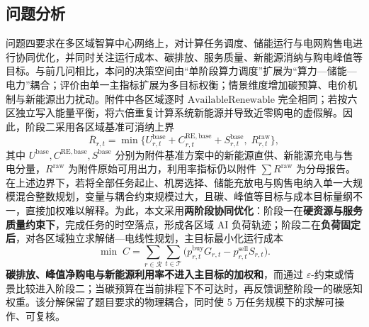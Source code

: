 \documentclass[UTF8,a4paper,zihao=-4]{ctexart}
\begin{document}
\subsection{问题分析}
问题四要求在多区域智算中心网络上，对计算任务调度、储能运行与电网购售电进行协同优化，并同时关注运行成本、碳排放、服务质量、新能源消纳与购电峰值等目标。与前几问相比，本问的决策空间由“单阶段算力调度”扩展为“算力—储能—电力”耦合；评价由单一主指标扩展为多目标权衡；情景维度增加碳预算、电价机制与新能源出力扰动。附件中各区域逐时 $\mathrm{AvailableRenewable}$ 完全相同；若按六区独立写入能量平衡，将六倍重复计算系统新能源并导致近零购电的虚假解。因此，阶段二采用各区域基准可消纳上界
\begin{equation}
\overline{R}_{r,t}
=
\min\bigl\{
U^{\mathrm{base}}_{r,t}+C^{\mathrm{RE,base}}_{r,t}+S^{\mathrm{base}}_{r,t},\;
R^{\mathrm{raw}}_{r,t}
\bigr\},
\end{equation}
其中 $U^{\mathrm{base}},C^{\mathrm{RE,base}},S^{\mathrm{base}}$ 分别为附件基准方案中的新能源直供、新能源充电与售电分量，$R^{\mathrm{raw}}$ 为附件原始可用出力，利用率指标仍以附件 $\sum R^{\mathrm{raw}}$ 为分母报告。
在上述边界下，若将全部任务起止、机房选择、储能充放电与购售电纳入单一大规模混合整数规划，变量与耦合约束规模过大，且碳、峰值等目标与成本目标量纲不一，直接加权难以解释。为此，本文采用\textbf{两阶段协同优化}\cite{康重庆2022碳视角,曹晓峻2018混合运行}：阶段一在\textbf{硬资源与服务质量约束下}，完成任务的时空落点，形成各区域 AI 负荷轨迹；阶段二在\textbf{负荷固定后}，对各区域独立求解储—电线性规划，主目标最小化运行成本
\begin{equation}
\min\;
C
=
\sum_{r\in\mathcal{R}}
\sum_{t\in\mathcal{T}}
\bigl(
p^{\mathrm{buy}}_{r,t}G_{r,t}
-
p^{\mathrm{sell}}_{r,t}S_{r,t}
\bigr).
\end{equation}
\textbf{碳排放、峰值净购电与新能源利用率不进入主目标的加权和}，而通过 $\varepsilon$-约束或情景比较进入阶段二；当碳预算在当前排程下不可达时，再反馈调整阶段一的碳感知权重。该分解保留了题目要求的物理耦合，同时使 5 万任务规模下的求解可操作、可复核。
\end{document}
